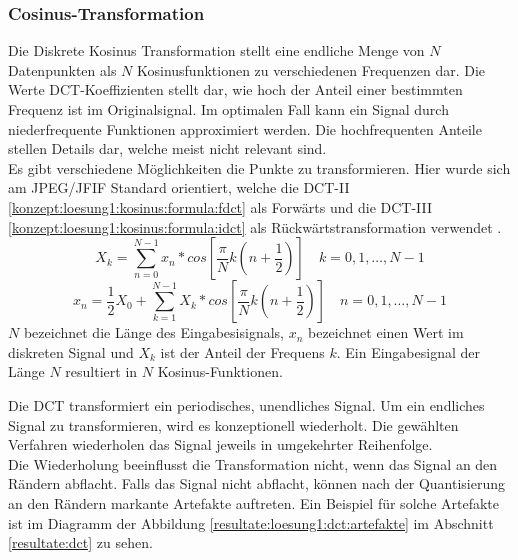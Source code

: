 \subsubsection{Cosinus-Transformation} \label{konzept:loesung1:kosinus}
Die Diskrete Kosinus Transformation stellt eine endliche Menge von $N$ Datenpunkten als $N$ Kosinusfunktionen zu verschiedenen Frequenzen dar. Die Werte DCT-Koeffizienten stellt dar, wie hoch der Anteil einer bestimmten Frequenz ist im Originalsignal. Im optimalen Fall kann ein Signal durch niederfrequente Funktionen approximiert werden. Die hochfrequenten Anteile stellen Details dar, welche meist nicht relevant sind.\\
Es gibt verschiedene Möglichkeiten die Punkte zu transformieren. Hier wurde sich am JPEG/JFIF Standard orientiert, welche die DCT-II \eqref{konzept:loesung1:kosinus:formula:fdct} als Forwärts und die DCT-III \eqref{konzept:loesung1:kosinus:formula:idct} als Rückwärtstransformation verwendet \cite{wallace1992jpeg}. 
\begin{equation} \label{konzept:loesung1:kosinus:formula:fdct}
	X_k = \sum_{n=0}^{N-1}x_n*cos[\frac{\pi}{N}k(n+\frac{1}{2})] \quad k = 0, 1, \ldots, N-1
\end{equation}
\begin{equation} \label{konzept:loesung1:kosinus:formula:idct}
x_n  = \frac{1}{2}X_0 + \sum_{k=1}^{N-1}X_k*cos[\frac{\pi}{N}k(n+\frac{1}{2})] \quad n = 0,1,\ldots,N-1
\end{equation}
$N$ bezeichnet die Länge des Eingabesisignals, $x_n$ bezeichnet einen Wert im diskreten Signal und $X_k$ ist der Anteil der Frequens $k$. Ein Eingabesignal der Länge $N$ resultiert in $N$ Kosinus-Funktionen.

Die DCT transformiert ein periodisches, unendliches Signal. Um ein endliches Signal zu transformieren, wird es konzeptionell wiederholt. Die gewählten Verfahren wiederholen das Signal jeweils in umgekehrter Reihenfolge.\\
Die Wiederholung beeinflusst die Transformation nicht, wenn das Signal an den Rändern abflacht. Falls das Signal nicht abflacht, können nach der Quantisierung an den Rändern markante Artefakte auftreten. Ein Beispiel für solche Artefakte ist im Diagramm der Abbildung \ref{resultate:loesung1:dct:artefakte} im Abschnitt \ref{resultate:dct} zu sehen.

